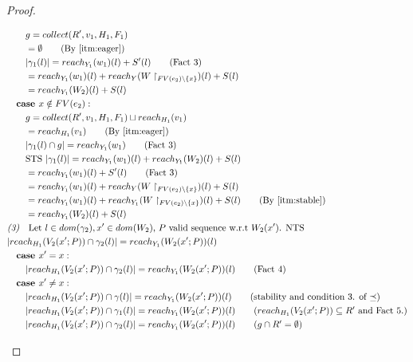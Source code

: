 \documentclass{easychair}
\theoremstyle{definition}
\begin{document}
\begin{proof}
\begin{description}
\begin{align*}
		&\quad\quad g =  collect(R',v_1,H_1,F_1) \\
		&\quad\quad = \emptyset  \tag{By \ref{itm:eager}}\\
		&\quad\quad |\gamma_1(l)| = reach_{Y_1}(w_1)(l) + S'(l) \tag{Fact 3}\\
		&\quad\quad = reach_{Y_1}(w_1)(l) + 
			reach_{Y}(W\restriction_{FV(e_2) \setminus \{x\}})(l) + S(l) \\
		&\quad\quad = reach_{Y_1}(W_2)(l) + S(l)  \\
		&\quad \textbf{case } x \notin FV(e_2):\\
		&\quad\quad g = collect(R',v_1,H_1,F_1) \sqcup reach_{H_1}(v_1)\\
		&\quad\quad = reach_{H_1}(v_1) \tag{By \ref{itm:eager}}\\
		&\quad\quad |\gamma_1(l) \cap g| = reach_{Y_1}(w_1) \tag{Fact 3}\\
		&\quad\quad \text{STS } |\gamma_1(l)| = reach_{Y_1}(w_1)(l) + reach_{Y_1}(W_2)(l) + S(l)\\
		&\quad\quad = reach_{Y_1}(w_1)(l) + S'(l)  \tag{Fact 3}\\
		&\quad\quad = reach_{Y_1}(w_1)(l) + reach_{Y}(W\restriction_{FV(e_2)\setminus \{x\}})(l) + S(l)\\
		&\quad\quad = reach_{Y_1}(w_1)(l) + reach_{Y_1}(W\restriction_{FV(e_2)\setminus \{x\}})(l) + S(l) 		\tag{By \ref{itm:stable}}\\
		&\quad\quad = reach_{Y_1}(W_2)(l) + S(l)\\
		&\emph{(3)}\quad \text{Let $l \in dom(\gamma_2), x' \in dom(W_2)$, 
			$P$ valid sequence w.r.t $W_2(x')$. NTS }\\ 
		&|reach_{H_1}(V_2(x';P)) \cap \gamma_2(l)| = reach_{Y_1}(W_2(x';P))(l)\\ 
		&\quad \textbf{case } x' = x:\\
		&\quad\quad |reach_{H_1}(V_2(x';P)) \cap \gamma_2(l)| = reach_{Y_1}(W_2(x';P))(l) \tag{Fact 4}\\ 
		&\quad \textbf{case } x' \ne x:\\
		&\quad\quad |reach_{H_1}(V_2(x';P)) \cap \gamma(l)| = reach_{Y_1}(W_2(x';P))(l) 
			\tag{stability and condition 3. of $\preceq$}\\ 
		&\quad\quad |reach_{H_1}(V_2(x';P)) \cap \gamma_1(l)| = reach_{Y_1}(W_2(x';P))(l) 
			\tag{$reach_{H_1}(V_2(x';P)) \subseteq R'$ and Fact 5.}\\
		&\quad\quad |reach_{H_1}(V_2(x';P)) \cap \gamma_2(l)| = reach_{Y_1}(W_2(x';P))(l) 
			\tag{$g \cap R' = \emptyset$}\\

\end{align*}
\end{description}
\end{proof}
\end{document}

